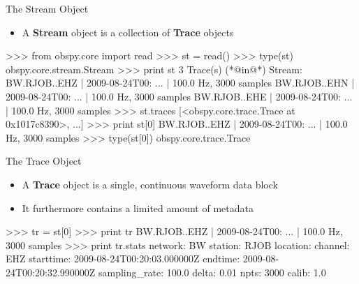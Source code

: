 \begin{frame}{The Stream Object}
 \begin{itemize}
     \item A \textbf{Stream} object is a collection of \textbf{Trace} objects
 \end{itemize}

\begin{myColorBox}{0.95}{}
\begin{python}
>>> from obspy.core import read
>>> st = read()
>>> type(st)
obspy.core.stream.Stream
>>> print st
3 Trace(s) (*@in@*) Stream:
BW.RJOB..EHZ | 2009-08-24T00: ... | 100.0 Hz, 3000 samples
BW.RJOB..EHN | 2009-08-24T00: ... | 100.0 Hz, 3000 samples
BW.RJOB..EHE | 2009-08-24T00: ... | 100.0 Hz, 3000 samples
>>> st.traces
[<obspy.core.trace.Trace at 0x1017c8390>, ...]
>>> print st[0]
BW.RJOB..EHZ | 2009-08-24T00: ... | 100.0 Hz, 3000 samples
>>> type(st[0])
obspy.core.trace.Trace
\end{python}
\end{myColorBox}

\end{frame}

\begin{frame}{The Trace Object}

 \begin{itemize}
     \item A \textbf{Trace} object is a single, continuous waveform data block
     \item It furthermore contains a limited amount of metadata
 \end{itemize}


\begin{myColorBox}{0.95}{}
\begin{python}
>>> tr = st[0]
>>> print tr
BW.RJOB..EHZ | 2009-08-24T00: ... | 100.0 Hz, 3000 samples
>>> print tr.stats
         network: BW
         station: RJOB
        location:
         channel: EHZ
       starttime: 2009-08-24T00:20:03.000000Z
         endtime: 2009-08-24T00:20:32.990000Z
   sampling_rate: 100.0
           delta: 0.01
            npts: 3000
           calib: 1.0
\end{python}
\end{myColorBox}

\end{frame}


